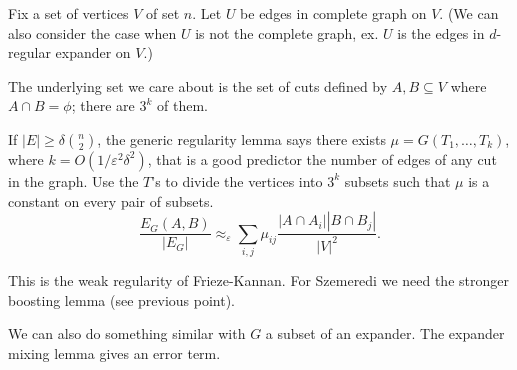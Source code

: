 \begin{enumerate}
Fix a set of vertices $V$ of set $n$. Let $U$ be edges in complete graph on $V$.
(We can also consider the case when $U$ is not the complete graph, ex. $U$ is the edges in $d$-regular expander on $V$.)

The underlying set we care about is the set of cuts defined by $A,B\subseteq V$ where $A\cap B=\phi$; there are $3^k$ of them.

If $|E|\ge \delta \binom n2$, the generic regularity lemma says there exists $\mu=G(T_1,\ldots, T_k)$, where $k=O(1/\varepsilon^2\delta^2)$, that is a good predictor the number of edges of any cut in the graph. 
Use the $T$'s to divide the vertices into $3^k$ subsets such that $\mu$ is a constant on every pair of subsets.
$$
\frac{E_G(A,B)}{|E_G|}
\approx_\varepsilon \sum_{i,j} 
\mu_{ij}
\frac{|A\cap A_i||B\cap B_j|}{|V|^2}.
$$

This is the weak regularity of Frieze-Kannan. For Szemeredi we need the stronger boosting lemma (see previous point).

We can also do something similar with $G$ a subset of an expander. The expander mixing lemma gives an error term.
\end{enumerate}
